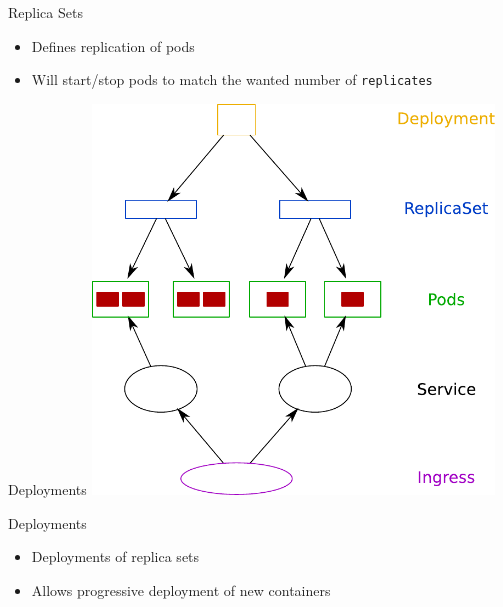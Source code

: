 \documentclass{dcpresentation}
\begin{document}
 \begin{frame}{Replica Sets}
  \begin{itemize}
   \item Defines replication of pods
   \item Will start/stop pods to match the wanted number of \texttt{replicates}
  \end{itemize}
 \end{frame}

 
 \begin{frame}{Deployments}
  \centering
  \includegraphics[width=0.8\textwidth]{img/arch-psird.pdf}
 \end{frame}

 \begin{frame}{Deployments}
  \begin{itemize}
   \item Deployments of replica sets
   \item Allows progressive deployment of new containers
  \end{itemize}
 \end{frame}
 
\end{document}
